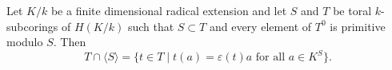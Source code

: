 Let $K/k$ be a finite dimensional radical extension and let $S$ and $T$ be toral $k$-subcorings of $H(K/k)$ such that $S \subset T$ and every element of $T^0$ is primitive modulo $S$. Then $$T \cap \langle S \rangle = \{t \in T \mid t(a) = \varepsilon(t)a \text{ for all } a \in K^S\}.$$
